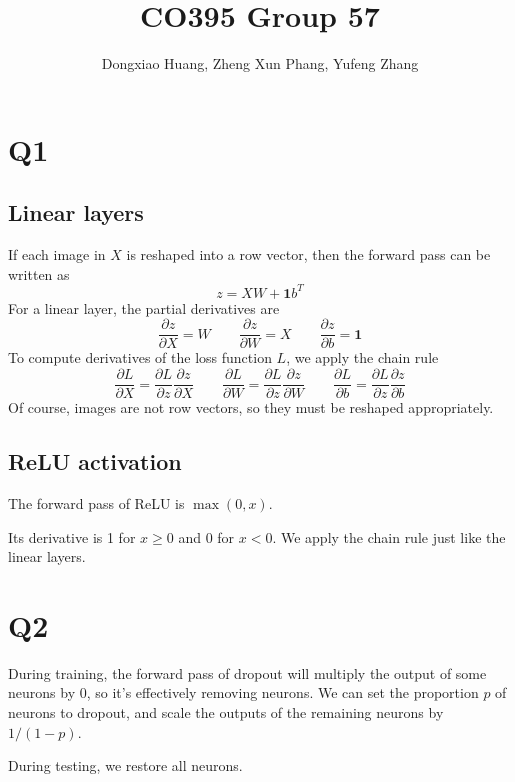 \documentclass[12pt, a4paper]{article}
\title{\vspace{-6ex} CO395 Group 57 \vspace{-1ex}}
\author{Dongxiao Huang, Zheng Xun Phang, Yufeng Zhang}
\date{\vspace{-3ex}}
\begin{document}
\maketitle
\newcommand\ones{\bm{1}}

\section*{Q1}
\subsection*{Linear layers}
If each image in $X$ is reshaped into a row vector, then the forward pass can be written as
\[ z = XW + \ones b^T \]
For a linear layer, the partial derivatives are
\[ \frac{\partial z}{\partial X} = W \qquad \frac{\partial z}{\partial W} = X \qquad \frac{\partial z}{\partial b} = \ones \]
To compute derivatives of the loss function $L$, we apply the chain rule
\[ \frac{\partial L}{\partial X} = \frac{\partial L}{\partial z} \frac{\partial z}{\partial X} \qquad \frac{\partial L}{\partial W} = \frac{\partial L}{\partial z} \frac{\partial z}{\partial W} \qquad \frac{\partial L}{\partial b} = \frac{\partial L}{\partial z} \frac{\partial z}{\partial b} \]
Of course, images are not row vectors, so they must be reshaped appropriately.

\subsection*{ReLU activation}
The forward pass of ReLU is $\max(0, x)$.\par
\bigskip
Its derivative is 1 for $x \geq 0$ and 0 for $x < 0$. We apply the chain rule just like the linear layers.

\section*{Q2}
During training, the forward pass of dropout will multiply the output of some neurons by 0, so it's effectively removing neurons. We can set the proportion $p$ of neurons to dropout, and scale the outputs of the remaining neurons by $1/(1-p)$.\par
\bigskip
During testing, we restore all neurons.
\end{document}
